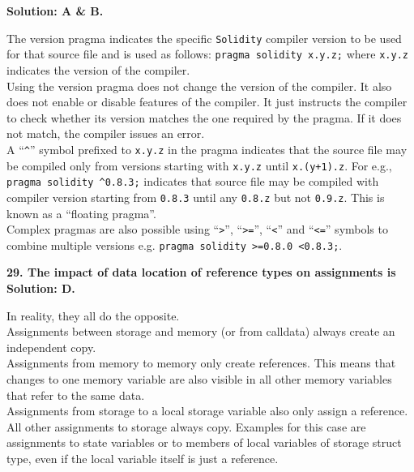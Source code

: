 \textbf{Solution: A \& B.}

The version pragma indicates the specific \verb|Solidity| compiler version to be used for that source file and is used as follows: \verb|pragma solidity x.y.z;| where \verb|x.y.z| indicates the version of the compiler.\\

Using the version pragma does not change the version of the compiler.
It also does not enable or disable features of the compiler.
It just instructs the compiler to check whether its version matches the one required by the pragma.
If it does not match, the compiler issues an error.\\

A ``\verb|^|'' symbol prefixed to \verb|x.y.z| in the pragma indicates that the source file may be compiled only from versions starting with \verb|x.y.z| until \verb|x.(y+1).z|.
For e.g., \verb|pragma solidity ^0.8.3;| indicates that source file may be compiled with compiler version starting from \verb|0.8.3| until any \verb|0.8.z| but not \verb|0.9.z|.
This is known as a ``floating pragma''.\\

Complex pragmas are also possible using ``\verb|>|'', ``\verb|>=|'', ``\verb|<|'' and ``\verb|<=|'' symbols to combine multiple versions e.g. \verb|pragma solidity >=0.8.0 <0.8.3;|.\\

\pagebreak

\textbf{29. The impact of data location of reference types on assignments is}\label{sec:exam2_q29}\\

\textbf{Solution: D.}

In reality, they all do the opposite.\\

Assignments between storage and memory (or from calldata) always create an independent copy.\\
Assignments from memory to memory only create references.
This means that changes to one memory variable are also visible in all other memory variables that refer to the same data.\\
Assignments from storage to a local storage variable also only assign a reference.\\
All other assignments to storage always copy.
Examples for this case are assignments to state variables or to members of local variables of storage struct type, even if the local variable itself is just a reference.\\

